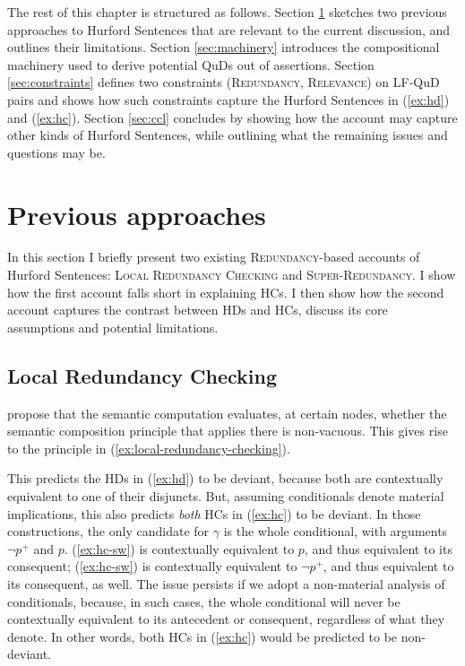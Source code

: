 The rest of this chapter is structured as follows. Section \ref{sec:prev-approaches} sketches two previous approaches to Hurford Sentences that are relevant to the current discussion, and outlines their limitations. Section \ref{sec:machinery} introduces the compositional machinery used to derive potential QuDs out of assertions. Section \ref{sec:constraints} defines two constraints (\textsc{Redundancy}, \textsc{Relevance}) on LF-QuD pairs and shows how such constraints capture the Hurford Sentences in (\ref{ex:hd}) and (\ref{ex:hc}). Section \ref{sec:ccl} concludes by showing how the account may capture other kinds of Hurford Sentences, while outlining what the remaining issues and questions may be.
\section{Previous approaches}\label{sec:prev-approaches}
In this section I briefly present two existing \textsc{Redundancy}-based accounts of Hurford Sentences: \textsc{Local Redundancy Checking} and \textsc{Super-Redundancy}. I show how the first account falls short in explaining HCs. I then show how the second account captures the contrast between HDs and HCs, discuss its core assumptions and potential limitations.
\subsection{Local Redundancy Checking}
\citet{Katzir2014} propose that the semantic computation evaluates, at
certain nodes, whether the semantic composition principle that applies there is non-vacuous. This gives rise to the principle in (\ref{ex:local-redundancy-checking}).
\begin{exe}
	\label{ex:local-redundancy-checking}
\end{exe}
This predicts the HDs in (\ref{ex:hd}) to be deviant, because both are contextually equivalent to one of their disjuncts. But, assuming conditionals denote material implications, this also predicts \textit{both} HCs in (\ref{ex:hc}) to be deviant. In those constructions, the only candidate for $\gamma$  is the whole conditional, with arguments $\neg p^+$ and $p$. (\ref{ex:hc-sw}) is contextually equivalent to $p$, and thus equivalent to its consequent; (\ref{ex:hc-sw}) is contextually equivalent to $\neg p^+$, and thus equivalent to its consequent, as well. 
The issue persists if we adopt a non-material analysis of conditionals, because, in such cases, the whole conditional will never be contextually equivalent to its antecedent or consequent, regardless of what they denote. In other words, both HCs in (\ref{ex:hc}) would be predicted to be non-deviant.


